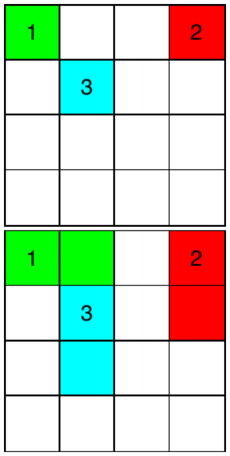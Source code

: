 \begin{frame}
\begin{columns}
	\begin{overprint}
		\centering\includegraphics[width=0.9\textwidth]{images/expansion-1.pdf}
		\onslide<2|handout:0>\centering\includegraphics[width=0.9\textwidth]{images/expansion-2.pdf}

\end{overprint}
\end{columns}
\end{frame}
